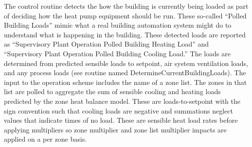 The control routine detects the how the building is currently being loaded as part of deciding how the heat pump equipment should be run.  These so-called ``Polled Building Loads'' mimic what a real building automation system might do to understand what is happening in the building.  These detected loads are reported as ``Supervisory Plant Operation Polled Building Heating Load'' and ``Supervisory Plant Operation Polled Building Cooling Load.''  The loads are determined from predicted sensible loads to setpoint, air system ventilation loads, and any process loads (see routine named DetermineCurrentBuildingLoads). The input to the operation scheme includes the name of a zone list.  The zones in that list are polled to aggregate the sum of sensible cooling and heating loads predicted by the zone heat balance model. These are loads-to-setpoint with the sign convention such that cooling loads are negative and summations neglect values that indicate times of no load. These are sensible heat load rates before applying multipliers so zone multiplier and zone list multiplier impacts are applied on a per zone basis. 


